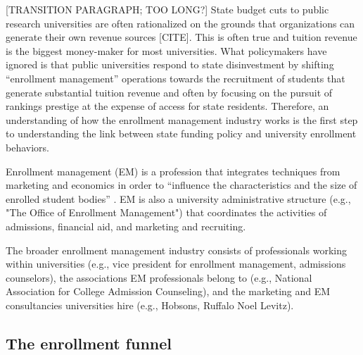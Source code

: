 \documentclass[twoside]{article}
\begin{document}
[TRANSITION PARAGRAPH; TOO LONG?] State budget cuts to public research universities are often rationalized on the grounds that organizations can generate their own revenue sources [CITE]. This is often true and tuition revenue is the biggest money-maker for most universities. What policymakers have ignored is that public universities respond to state disinvestment by shifting ``enrollment management'' operations towards the recruitment of students that generate substantial tuition revenue and often by focusing on the pursuit of rankings prestige at the expense of access for state residents.  Therefore, an understanding of how the enrollment management industry works is the first step to understanding the link between state funding policy and university enrollment behaviors.

Enrollment management (EM) is a profession that integrates techniques from marketing and economics in order to ``influence the characteristics and the size of enrolled student bodies'' \citep[p.~xiv]{RN2771}.  EM is also a university administrative structure (e.g., "The Office of Enrollment Management") that coordinates the activities of admissions, financial aid, and marketing and recruiting. 

The broader enrollment management industry consists of professionals working within universities (e.g., vice president for enrollment management, admissions counselors), the associations EM professionals belong to (e.g., National Association for College Admission Counseling), and the marketing and EM consultancies universities hire (e.g., Hobsons, Ruffalo Noel Levitz).

\subsection*{The enrollment funnel}

\end{document}
